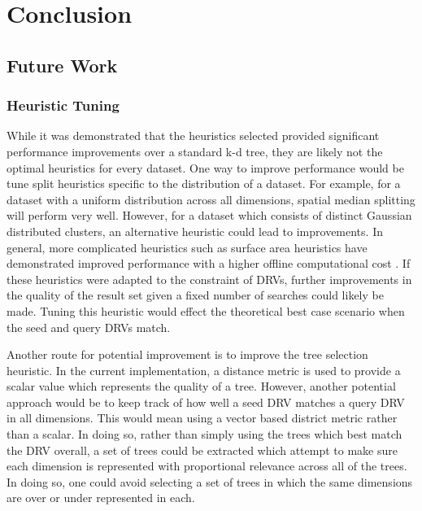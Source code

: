 \chapter{Conclusion} %

\label{conclusion} %


\section{Future Work}

\subsection{Heuristic Tuning}

While it was demonstrated that the heuristics selected provided significant performance improvements over a standard k-d tree, they are likely not the optimal heuristics for every dataset.  One way to improve performance would be tune split heuristics specific to the distribution of a dataset.  For example, for a dataset with a uniform distribution across all dimensions, spatial median splitting will perform very well.  However, for a dataset which consists of distinct Gaussian distributed clusters, an alternative heuristic could lead to improvements.  In general, more complicated heuristics such as surface area heuristics have demonstrated improved performance with a higher offline computational cost \citep{hunt2006fast}.  If these heuristics were adapted to the constraint of DRVs, further improvements in the quality of the result set given a fixed number of searches could likely be made.  Tuning this heuristic would effect the theoretical best case scenario when the seed and query DRVs match.

Another route for potential improvement is to improve the tree selection heuristic.  In the current implementation, a distance metric is used to provide a scalar value which represents the quality of a tree.  However, another potential approach would be to keep track of how well a seed DRV matches a query DRV in all dimensions.  This would mean using a vector based district metric rather than a scalar.  In doing so, rather than simply using the trees which best match the DRV overall, a set of trees could be extracted which attempt to make sure each dimension is represented with proportional relevance across all of the trees. In doing so, one could avoid selecting a set of trees in which the same dimensions are over or under represented in each.

